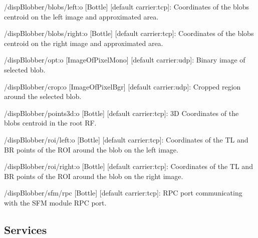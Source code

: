 \begin{DoxyItemize}
\item /disp\+Blobber/blobs/left\+:o \mbox{[}Bottle\mbox{]} \mbox{[}default carrier\+:tcp\mbox{]}\+: Coordinates of the blob\textquotesingle{}s centroid on the left image and approximated area.
\item /disp\+Blobber/blobs/right\+:o \mbox{[}Bottle\mbox{]} \mbox{[}default carrier\+:tcp\mbox{]}\+: Coordinates of the blob\textquotesingle{}s centroid on the right image and approximated area.
\item /disp\+Blobber/opt\+:o \mbox{[}Image\+Of\+Pixel\+Mono\mbox{]} \mbox{[}default carrier\+:udp\mbox{]}\+: Binary image of selected blob.
\item /disp\+Blobber/crop\+:o \mbox{[}Image\+Of\+Pixel\+Bgr\mbox{]} \mbox{[}default carrier\+:udp\mbox{]}\+: Cropped region around the selected blob.
\item /disp\+Blobber/points3d\+:o \mbox{[}Bottle\mbox{]} \mbox{[}default carrier\+:tcp\mbox{]}\+: 3D Coordinates of the blob\textquotesingle{}s centroid in the root RF.
\item /disp\+Blobber/roi/left\+:o \mbox{[}Bottle\mbox{]} \mbox{[}default carrier\+:tcp\mbox{]}\+: Coordinates of the TL and BR points of the R\+OI around the blob on the left image.
\item /disp\+Blobber/roi/right\+:o \mbox{[}Bottle\mbox{]} \mbox{[}default carrier\+:tcp\mbox{]}\+: Coordinates of the TL and BR points of the R\+OI around the blob on the right image.
\item /disp\+Blobber/sfm/rpc \mbox{[}Bottle\mbox{]} \mbox{[}default carrier\+:tcp\mbox{]}\+: R\+PC port communicating with the S\+FM module R\+PC port.
\end{DoxyItemize}\hypertarget{group__seg2cloud_services_sec}{}\subsection{Services}\label{group__seg2cloud_services_sec}

